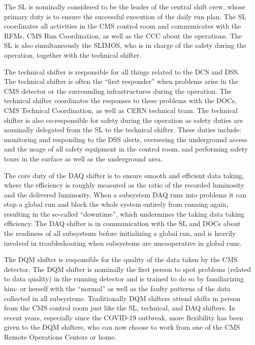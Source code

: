 The \ac{SL} is nominally considered to be the leader of the central shift crew, whose primary duty is to ensure the successful execution of the daily run plan. The \ac{SL} coordinates all activities in the \ac{CMS} control room and communicates with the \acp{RFM}, \ac{CMS} Run Coordination, as well as the \ac{CCC} about the operations. The \ac{SL} is also simultaneously the \ac{SLIMOS}, who is in charge of the safety during the operation, together with the technical shifter. 

The technical shifter is responsible for all things related to the \ac{DCS} and \ac{DSS}. The technical shifter is often the ``first responder'' when problems arise in the \ac{CMS} detector or the surrounding infrastructures during the operation. The technical shifter coordinates the responses to these problems with the \acp{DOC}, \ac{CMS} Technical Coordination, as well as \ac{CERN} technical team. The technical shifter is also co-responsible for safety during the operation as safety duties are nominally delegated from the \ac{SL} to the technical shifter. These duties include: monitoring and responding to the \ac{DSS} alerts, overseeing the underground access and the usage of all safety equipment in the control room, and performing safety tours in the surface as well as the underground area. 

The core duty of the \ac{DAQ} shifter is to ensure smooth and efficient data taking, where the efficiency is roughly measured as the ratio of the recorded luminosity and the delivered luminosity. When a subsystem \ac{DAQ} runs into problems it can stop a global run and block the whole system entirely from running again, resulting in the so-called ``downtime'', which undermines the taking data taking efficiency. The \ac{DAQ} shifter is in communication with the \ac{SL} and \acp{DOC} about the readiness of all subsystems before initializing a global run, and is heavily involved in troubleshooting when subsystems are uncooperative in global runs.

The \ac{DQM} shifter is responsible for the quality of the data taken by the \ac{CMS} detector. The \ac{DQM} shifter is nominally the first person to spot problems (related to data quality) in the running detector and is trained to do so by familiarizing him- or herself with the ``normal'' as well as the faulty patterns of the data collected in all subsystems. Traditionally \ac{DQM} shifters attend shifts in person from the \ac{CMS} control room just like the \ac{SL}, technical, and \ac{DAQ} shifters. In recent years, especially since the COVID-19 outbreak, more flexibility has been given to the \ac{DQM} shifters, who can now choose to work from one of the \ac{CMS} Remote Operations Centers or home.


